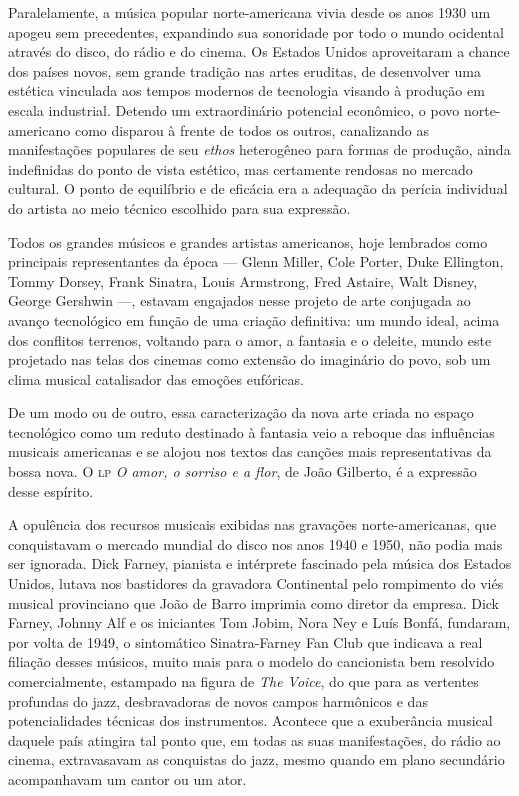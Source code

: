 Paralelamente, a música popular norte-americana vivia desde os anos 1930
um apogeu sem precedentes, expandindo sua sonoridade por todo o mundo
ocidental através do disco, do rádio e do cinema. Os Estados Unidos
aproveitaram a chance dos países novos, sem grande tradição nas artes
eruditas, de desenvolver uma estética vinculada aos tempos modernos de
tecnologia visando à produção em escala industrial. Detendo um
extraordinário potencial econômico, o povo norte-americano como disparou
à frente de todos os outros, canalizando as manifestações populares de
seu \textit{ethos} heterogêneo para formas de produção, ainda indefinidas do
ponto de vista estético, mas certamente rendosas no mercado cultural. O
ponto de equilíbrio e de eficácia era a adequação da perícia individual
do artista ao meio técnico escolhido para sua expressão.

Todos os grandes músicos e grandes artistas americanos, hoje lembrados
como principais representantes da época --- Glenn Miller, Cole Porter, Duke
Ellington, Tommy Dorsey, Frank Sinatra, Louis Armstrong, Fred Astaire,
Walt Disney, George Gershwin ---, estavam engajados nesse projeto de arte
conjugada ao avanço tecnológico em função de uma criação definitiva: um
mundo ideal, acima dos conflitos terrenos, voltando para o amor, a
fantasia e o deleite, mundo este projetado nas telas dos cinemas como
extensão do imaginário do povo, sob um clima musical catalisador das
emoções eufóricas.

De um modo ou de outro, essa caracterização da nova arte criada no
espaço tecnológico como um reduto destinado à fantasia veio a reboque
das influências musicais americanas e se alojou nos textos das canções
mais representativas da bossa nova. O \textsc{lp} \textit{O amor, o sorriso e a flor}, de
João Gilberto, é a expressão desse espírito.

A opulência dos recursos musicais exibidas nas gravações
norte-americanas, que conquistavam o mercado mundial do disco nos anos
1940 e 1950, não podia mais ser ignorada. Dick Farney, pianista e intérprete
fascinado pela música dos Estados Unidos, lutava nos bastidores da
gravadora Continental pelo rompimento do viés musical provinciano que
João de Barro imprimia como diretor da empresa. Dick Farney, Johnny Alf
e os iniciantes Tom Jobim, Nora Ney e Luís Bonfá, fundaram, por volta de
1949, o sintomático Sinatra-Farney Fan Club que indicava a real filiação
desses músicos, muito mais para o modelo do cancionista bem resolvido
comercialmente, estampado na figura de \textit{The Voice}, do que para as
vertentes profundas do jazz, desbravadoras de novos campos harmônicos e
das potencialidades técnicas dos instrumentos. Acontece que a
exuberância musical daquele país atingira tal ponto que, em todas as
suas manifestações, do rádio ao cinema, extravasavam as conquistas do
jazz, mesmo quando em plano secundário acompanhavam um cantor ou um
ator.

